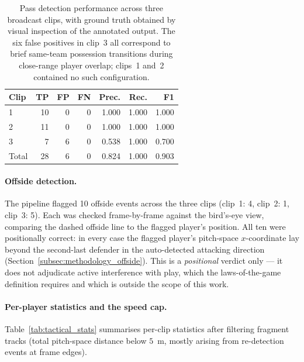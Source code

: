 \begin{table}[h]
\centering
\small
\begin{tabular}{lrrrrrr}
\toprule
Clip & TP & FP & FN & Prec. & Rec. & F1 \\
\midrule
1     & 10 & 0  & 0 & 1.000 & 1.000 & 1.000 \\
2     & 11 & 0  & 0 & 1.000 & 1.000 & 1.000 \\
3     & 7  & 6  & 0 & 0.538 & 1.000 & 0.700 \\
\midrule
Total & 28 & 6  & 0 & 0.824 & 1.000 & 0.903 \\
\bottomrule
\end{tabular}
\caption[Pass detection: per-clip and aggregate
precision/recall.]{Pass detection performance across three
broadcast clips, with ground truth obtained by visual inspection of
the annotated output. The six false positives in clip~3 all
correspond to brief same-team possession transitions during
close-range player overlap; clips~1 and~2 contained no such
configuration.}
\label{tab:pass_detection}
\end{table}

\paragraph{Offside detection.}
The pipeline flagged 10 offside events across the three clips
(clip~1: 4, clip~2: 1, clip~3: 5). Each was checked frame-by-frame
against the bird's-eye view, comparing the dashed offside line to the
flagged player's position. All ten were positionally correct: in
every case the flagged player's pitch-space $x$-coordinate lay beyond
the second-last defender in the auto-detected attacking direction
(Section~\ref{subsec:methodology_offside}). This is a
\emph{positional} verdict only --- it does not adjudicate active
interference with play, which the laws-of-the-game definition
requires and which is outside the scope of this work.

\paragraph{Per-player statistics and the speed cap.}
Table~\ref{tab:tactical_stats} summarises per-clip statistics after
filtering fragment tracks (total pitch-space distance below $5$~m, mostly arising from re-detection events at frame edges).

